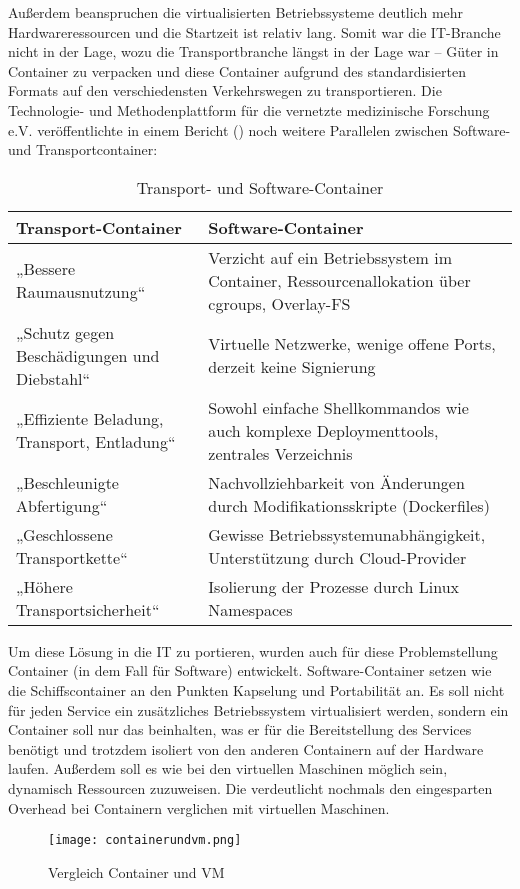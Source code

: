Außerdem beanspruchen die virtualisierten Betriebssysteme deutlich mehr Hardwareressourcen und die Startzeit ist relativ lang.
Somit war die IT-Branche nicht in der Lage, wozu die Transportbranche längst in der Lage war -- Güter in Container zu verpacken und diese Container aufgrund des standardisierten Formats auf den verschiedensten Verkehrswegen zu transportieren. Die Technologie- und Methodenplattform für die vernetzte medizinische Forschung e.V. veröffentlichte in einem Bericht (\cite{TUM}) noch weitere Parallelen zwischen Software- und Transportcontainer:
\begin{table}[h]
\def\arraystretch{1.5}%
\begin{tabular}{|p{}|p{}|}\hline
	\textbf{Transport-Container} & \textbf{Software-Container} \\ \hline
	„Bessere Raumausnutzung“ & Verzicht auf ein Betriebssystem im Container, Ressourcenallokation über cgroups, Overlay-FS \\ \hline
	„Schutz gegen Beschädigungen und Diebstahl“ & Virtuelle Netzwerke, wenige offene Ports, derzeit keine Signierung \\ \hline
	„Effiziente Beladung, Transport, Entladung“ & Sowohl einfache Shellkommandos wie auch komplexe Deploymenttools, zentrales Verzeichnis \\ \hline
	„Beschleunigte Abfertigung“ & Nachvollziehbarkeit von Änderungen durch Modifikationsskripte (Dockerfiles) \\ \hline
	„Geschlossene Transportkette“ &Gewisse Betriebssystemunabhängigkeit, Unterstützung durch Cloud-Provider \\ \hline
	„Höhere Transportsicherheit“ & Isolierung der Prozesse durch Linux Namespaces \\ \hline
\end{tabular}
\caption{Transport- und Software-Container}
\end{table}

Um diese Lösung in die IT zu portieren, wurden auch für diese Problemstellung Container (in dem Fall für Software) entwickelt.
Software-Container setzen wie die Schiffscontainer an den Punkten Kapselung und Portabilität an.
Es soll nicht für jeden Service ein zusätzliches Betriebssystem virtualisiert werden, sondern ein Container soll nur das beinhalten, was er für die Bereitstellung des Services benötigt und trotzdem isoliert von den anderen Containern auf der Hardware laufen.
Außerdem soll es wie bei den virtuellen Maschinen möglich sein, dynamisch Ressourcen zuzuweisen.\cite{12005068320161201, redhat}
Die  verdeutlicht nochmals den eingesparten Overhead bei Containern verglichen mit virtuellen Maschinen.
\begin{figure}[H]
	\begin{center}
		\texttt{[image: containerundvm.png]}
	\end{center}
	\caption[Vergleich Container und VM]{Vergleich Container und VM \footnotemark}
	\label{fig:VergleichContainerVM}
\end{figure}
\newpage


